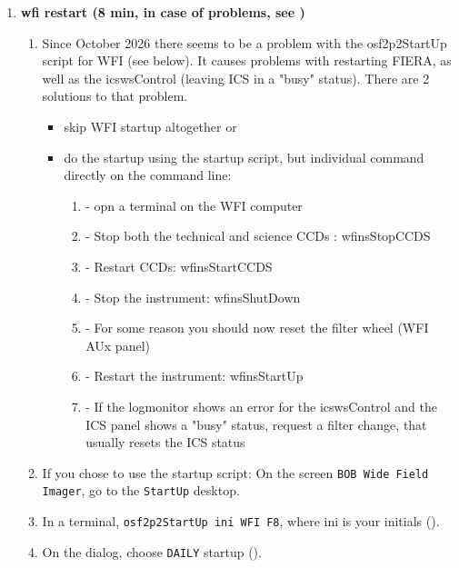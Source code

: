 \documentclass[11pt,fleqn,a4paper]{book}
\begin{document}
\bigskip
{} 
\label{proc:startup}
\begin{enumerate}
  \item \label{list:wfistartup}\textbf{\gls{wfi} restart (8 min, in case of problems, see )}
        \begin{enumerate}
        	
          \item Since October 2026 there seems to be a problem with the osf2p2StartUp script for WFI (see below). It causes problems with restarting FIERA, as well as the icswsControl (leaving ICS in a "busy" status).  There are 2 solutions to that problem.
           \begin{itemize}
           	
           \item skip WFI startup altogether or
           \item do the startup using the startup script, but individual command directly on the command line:
           \begin{enumerate}
           	\item - opn a terminal on the WFI computer
           	\item - Stop both the technical and science CCDs : wfinsStopCCDS
           	\item - Restart CCDs: wfinsStartCCDS
           	\item - Stop the instrument: wfinsShutDown
           	\item - For some reason you should now reset the filter wheel (WFI AUx panel)
           	\item - Restart the instrument: wfinsStartUp
           	\item - If the logmonitor shows an error for the icswsControl and the ICS panel shows a "busy" status, request a filter change, that usually resets the ICS status
           	\end{enumerate}
           \end{itemize}
           \bigskip
          \item  If you chose to use the startup script: On the screen \texttt{BOB Wide Field Imager}, go to the \texttt{StartUp} \gls{desktop}.\label{list:wfi1}
          \item In a terminal, \texttt{\gls{osf2p2StartUp} ini WFI F8}, where ini is your initials ().
          \item On the dialog, choose \texttt{DAILY} startup ().

\end{enumerate}
\end{enumerate}
\end{document}
